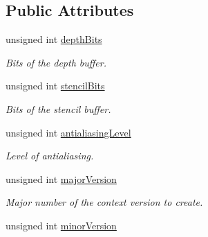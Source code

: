 \subsection*{Public Attributes}
\begin{DoxyCompactItemize}
\item 
\mbox{\label{structsf_1_1_context_settings_a4809e22089c2af7276b8809b5aede7bb}} 
unsigned int \mbox{\hyperlink{structsf_1_1_context_settings_a4809e22089c2af7276b8809b5aede7bb}{depth\+Bits}}
\begin{DoxyCompactList}\small\item\em Bits of the depth buffer. \end{DoxyCompactList}\item 
\mbox{\label{structsf_1_1_context_settings_ac2e788c201ca20e84fd38a28071abd29}} 
unsigned int \mbox{\hyperlink{structsf_1_1_context_settings_ac2e788c201ca20e84fd38a28071abd29}{stencil\+Bits}}
\begin{DoxyCompactList}\small\item\em Bits of the stencil buffer. \end{DoxyCompactList}\item 
\mbox{\label{structsf_1_1_context_settings_ac4a097be18994dba38d73f36b0418bdc}} 
unsigned int \mbox{\hyperlink{structsf_1_1_context_settings_ac4a097be18994dba38d73f36b0418bdc}{antialiasing\+Level}}
\begin{DoxyCompactList}\small\item\em Level of antialiasing. \end{DoxyCompactList}\item 
\mbox{\label{structsf_1_1_context_settings_a99a680d5c15a7e34c935654155dd5166}} 
unsigned int \mbox{\hyperlink{structsf_1_1_context_settings_a99a680d5c15a7e34c935654155dd5166}{major\+Version}}
\begin{DoxyCompactList}\small\item\em Major number of the context version to create. \end{DoxyCompactList}\item 
\mbox{\label{structsf_1_1_context_settings_aaeb0efe9d2658b840da93b30554b100f}} 
unsigned int \mbox{\hyperlink{structsf_1_1_context_settings_aaeb0efe9d2658b840da93b30554b100f}{minor\+Version}}

\end{DoxyCompactItemize}
